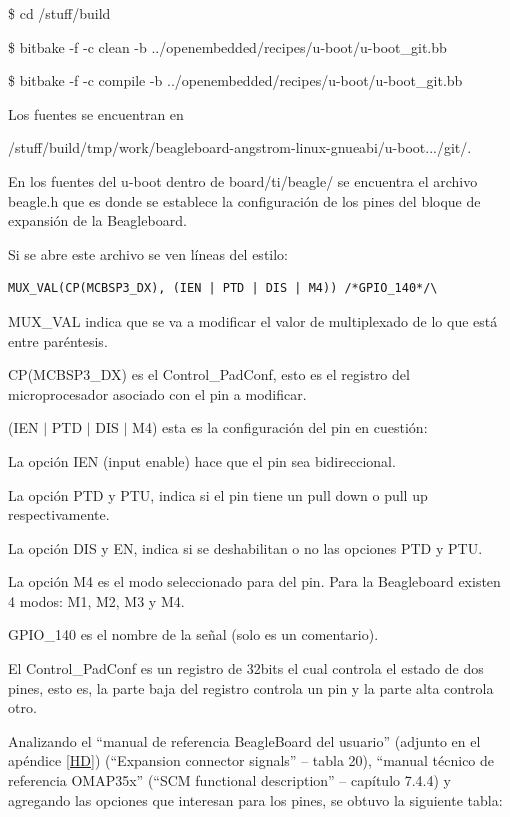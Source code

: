 \centerline{\$ cd /stuff/build}

\centerline{\$ bitbake -f -c clean -b ../openembedded/recipes/u-boot/u-boot\_git.bb}

\centerline{\$ bitbake -f -c compile -b ../openembedded/recipes/u-boot/u-boot\_git.bb}

\bigskip
Los fuentes se encuentran en 

/stuff/build/tmp/work/beagleboard-angstrom-linux-gnueabi/u-boot.../git/.

\bigskip
En los fuentes del u-boot dentro de board/ti/beagle/ se encuentra el archivo beagle.h que es donde se establece la configuración de los pines del bloque de expansión de la Beagleboard.

Si se abre este archivo se ven líneas del estilo: 

\begin{verbatim}
MUX_VAL(CP(MCBSP3_DX), (IEN | PTD | DIS | M4)) /*GPIO_140*/\
\end{verbatim}

MUX\_VAL indica que se va a modificar el valor de multiplexado de lo que está entre paréntesis. 

\bigskip
CP(MCBSP3\_DX) es el Control\_PadConf, esto es el registro del microprocesador asociado con el 
pin a modificar. 

\bigskip
(IEN $|$ PTD $|$ DIS $|$ M4) esta es la configuración del pin en cuestión: 


La opción IEN (input enable) hace que el pin sea bidireccional. 

La opción PTD y PTU, indica si el pin tiene un pull down o pull up respectivamente. 

La opción DIS y EN, indica si se deshabilitan o no las opciones PTD y PTU. 

La opción M4 es el modo seleccionado para del pin. Para la Beagleboard existen 4 modos: M1, M2, M3 y M4.

GPIO\_140 es el nombre de la señal (solo es un comentario). 

\bigskip
El Control\_PadConf es un registro de 32bits el cual controla el estado de dos pines, esto es, la parte 
baja del registro controla un pin y la parte alta controla otro. 

Analizando el “manual de referencia BeagleBoard del usuario” (adjunto en el apéndice \ref{HD}) (“Expansion connector signals” – tabla 20), “manual técnico de referencia OMAP35x” (“SCM functional description” – capítulo 7.4.4) y agregando las opciones que interesan para los pines, se obtuvo la siguiente tabla: 

